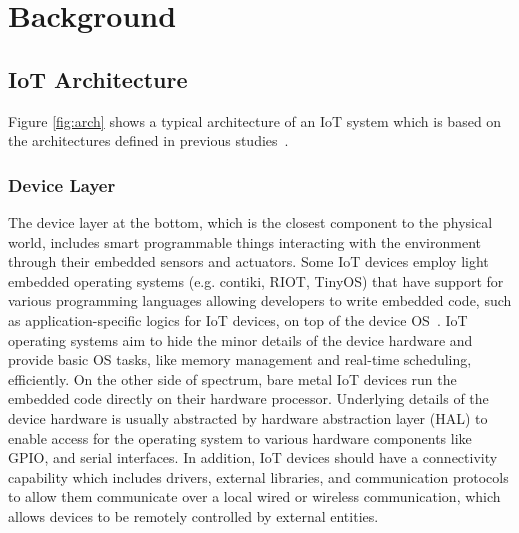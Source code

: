 
\chapter{Background}
\label{ch:background}

\section{IoT Architecture}
Figure \autoref{fig:arch} shows a typical architecture of an IoT system which is based on the architectures defined in previous studies~\citep{towardsIoTDefinition,stojkoska2017review,vcolakovic2018IoT,eclipse2016three}. 

\subsection{Device Layer}
The device layer at the bottom, which is the closest component to the physical world, includes smart programmable things interacting with the environment through their embedded sensors and actuators. Some IoT devices employ light embedded operating systems (e.g. contiki, RIOT, TinyOS) that have support for various programming languages allowing developers to write embedded code, such as application-specific logics for IoT devices, on top of the device OS~\cite{javed2018OS}. IoT operating systems aim to hide the minor details of the device hardware and provide basic OS tasks, like memory management and real-time scheduling, efficiently\cite{javed2018OS}. On the other side of spectrum, bare metal IoT devices run the embedded code directly on their hardware processor. Underlying details of the device hardware is usually abstracted by hardware abstraction layer (HAL) to enable access for the operating system to various hardware components like GPIO, and serial interfaces\cite{eclipse2016three}. In addition, IoT devices should have a connectivity capability which includes drivers, external libraries, and communication protocols to allow them communicate over a local wired or wireless communication, which allows devices to be remotely controlled by external entities.

